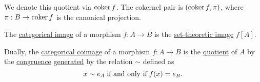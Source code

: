 \begin{proposition}
\begin{thmenum}
    We denote this quotient via \( \operatorname*{co\negthinspace\ker} f \). The cokernel pair is \( (\operatorname*{co\negthinspace\ker} f, \pi) \), where \( \pi: B \to \operatorname*{co\negthinspace\ker} f \) is the canonical projection.

     The \hyperref[def:zero_morphisms/image]{categorical image} of a morphism \( f: A \to B \) is the \hyperref[def:set_valued_map/image]{set-theoretic image} \( f[A] \).

     Dually, the \hyperref[def:zero_morphisms/coimage]{categorical coimage} of a morphism \( f: A \to B \) is the \hyperref[def:first_order_quotient]{quotient} of \( A \) by the \hyperref[def:first_order_congruence]{congruence} \hyperref[def:first_order_generated_congruence]{generated} by the relation \( {\sim} \) defined as
    \begin{equation*}
      x \sim e_A \T{if and only if} f(x) = e_B.
    \end{equation*}
  \end{thmenum}
\end{proposition}
